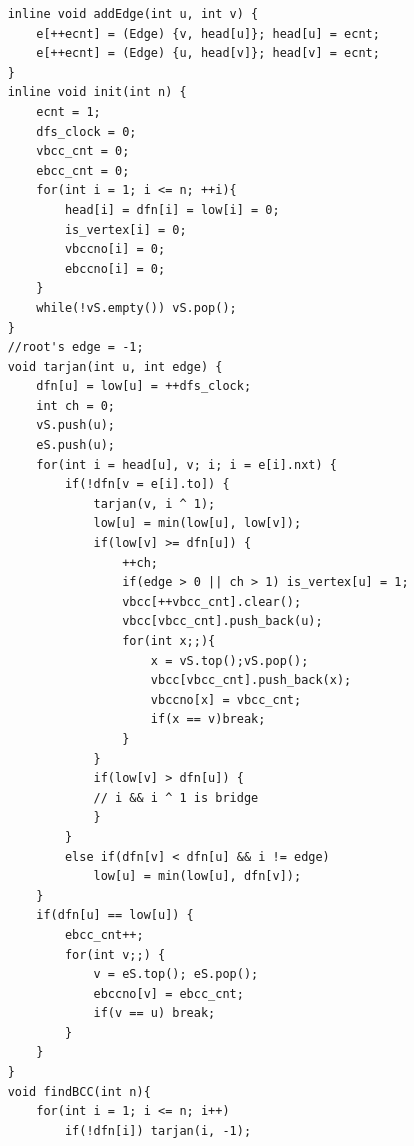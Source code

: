 \documentclass[10pt]{ctexart}
\begin{document}
{\begin{lstlisting}
    inline void addEdge(int u, int v) {
        e[++ecnt] = (Edge) {v, head[u]}; head[u] = ecnt;
        e[++ecnt] = (Edge) {u, head[v]}; head[v] = ecnt;
    }
    inline void init(int n) {
        ecnt = 1;
        dfs_clock = 0;
        vbcc_cnt = 0;                                         
        ebcc_cnt = 0;                                         
        for(int i = 1; i <= n; ++i){
            head[i] = dfn[i] = low[i] = 0;
            is_vertex[i] = 0;                                 
            vbccno[i] = 0;                                    
            ebccno[i] = 0;                                    
        }
        while(!vS.empty()) vS.pop();                          
    }
    //root's edge = -1;
    void tarjan(int u, int edge) {
        dfn[u] = low[u] = ++dfs_clock;
        int ch = 0;                                           
        vS.push(u);                                           
        eS.push(u);                                           
        for(int i = head[u], v; i; i = e[i].nxt) {
            if(!dfn[v = e[i].to]) {
                tarjan(v, i ^ 1);
                low[u] = min(low[u], low[v]);
                if(low[v] >= dfn[u]) {                        
                    ++ch;                                     
                    if(edge > 0 || ch > 1) is_vertex[u] = 1;  
                    vbcc[++vbcc_cnt].clear();                 
                    vbcc[vbcc_cnt].push_back(u);              
                    for(int x;;){                             
                        x = vS.top();vS.pop();                
                        vbcc[vbcc_cnt].push_back(x);          
                        vbccno[x] = vbcc_cnt;                 
                        if(x == v)break;                      
                    }                                         
                }                                             
                if(low[v] > dfn[u]) {                          
                // i && i ^ 1 is bridge                               
                }                                             
            }
            else if(dfn[v] < dfn[u] && i != edge) 
                low[u] = min(low[u], dfn[v]);
        }
        if(dfn[u] == low[u]) {                                 
            ebcc_cnt++;                                       
            for(int v;;) {                                     
                v = eS.top(); eS.pop();                       
                ebccno[v] = ebcc_cnt;                         
                if(v == u) break;                             
            }                                                 
        }                                                     
    }
    void findBCC(int n){
        for(int i = 1; i <= n; i++)
            if(!dfn[i]) tarjan(i, -1);


\end{lstlisting}}
\end{document}
